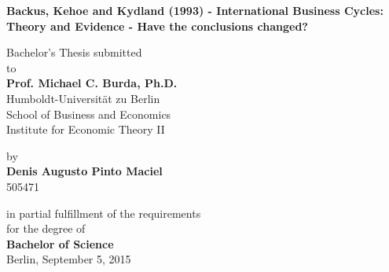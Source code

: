 \begin{center}

    {\Large\bfseries Backus, Kehoe and Kydland (1993) - International Business Cycles: Theory and Evidence - Have the conclusions changed?} \vspace{0.5cm}


    {\normalsize Bachelor's Thesis submitted\\\vspace{0.5cm}
    to}\\\vspace{0.5cm}
    {\normalsize\bfseries Prof. Michael C. Burda, Ph.D.} \\\vspace{0.5cm}
    {\normalsize Humboldt-Universit\"at zu Berlin \\
    School of Business and Economics \\

    Institute for Economic Theory II} \vspace{1cm}


    {\normalsize by \\\vspace{0.5cm}
    {\bfseries Denis Augusto Pinto Maciel} \\
    505471} \vspace{1cm}


    {\normalsize in partial fulfillment of the requirements \\
    for the degree of \\
    {\bfseries Bachelor of Science} \\
    Berlin, September 5, 2015}

\end{center}
